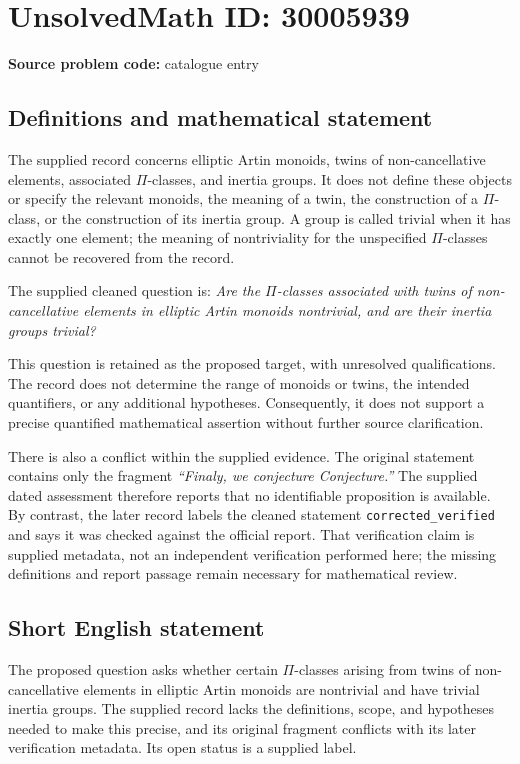 \documentclass[11pt]{article}
\begin{document}
\section*{UnsolvedMath ID: 30005939}
\textbf{Source problem code:} catalogue entry
\subsection{Definitions and mathematical statement}
The supplied record concerns elliptic Artin monoids, twins of non-cancellative elements, associated $\Pi$-classes, and inertia groups. It does not define these objects or specify the relevant monoids, the meaning of a twin, the construction of a $\Pi$-class, or the construction of its inertia group. A group is called trivial when it has exactly one element; the meaning of nontriviality for the unspecified $\Pi$-classes cannot be recovered from the record.

The supplied cleaned question is: \emph{Are the $\Pi$-classes associated with twins of non-cancellative elements in elliptic Artin monoids nontrivial, and are their inertia groups trivial?}

This question is retained as the proposed target, with unresolved qualifications. The record does not determine the range of monoids or twins, the intended quantifiers, or any additional hypotheses. Consequently, it does not support a precise quantified mathematical assertion without further source clarification.

There is also a conflict within the supplied evidence. The original statement contains only the fragment \emph{``Finaly, we conjecture Conjecture.''} The supplied dated assessment therefore reports that no identifiable proposition is available. By contrast, the later record labels the cleaned statement \texttt{corrected\_verified} and says it was checked against the official report. That verification claim is supplied metadata, not an independent verification performed here; the missing definitions and report passage remain necessary for mathematical review.
\subsection{Short English statement}
The proposed question asks whether certain $\Pi$-classes arising from twins of non-cancellative elements in elliptic Artin monoids are nontrivial and have trivial inertia groups. The supplied record lacks the definitions, scope, and hypotheses needed to make this precise, and its original fragment conflicts with its later verification metadata. Its open status is a supplied label.
\end{document}
